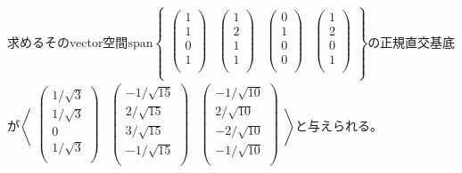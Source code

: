 \documentclass[dvipdfmx]{jsarticle}
\begin{document}
求めるそのvector空間$\mathrm{span}\begin{Bmatrix}
\begin{pmatrix}
  1 \\
  1 \\
  0 \\
  1 \\
\end{pmatrix} & \begin{pmatrix}
  1 \\
  2 \\
  1 \\
  1 \\
\end{pmatrix} & \begin{pmatrix}
  0 \\
  1 \\
  0 \\
  0 \\
\end{pmatrix} & \begin{pmatrix}
  1 \\
  2 \\
  0 \\
  1 \\
\end{pmatrix} \\
\end{Bmatrix}$の正規直交基底が$\left\langle \begin{matrix}
\begin{pmatrix}
  {1}/{\sqrt{3}} \\
  {1}/{\sqrt{3}} \\
  0 \\
  {1}/{\sqrt{3}} \\
\end{pmatrix} & \begin{pmatrix}
   - {1}/{\sqrt{15}} \\
  {2}/{\sqrt{15}} \\
  {3}/{\sqrt{15}} \\
   - {1}/{\sqrt{15}} \\
\end{pmatrix} & \begin{pmatrix}
   - {1}/{\sqrt{10}} \\
  {2}/{\sqrt{10}} \\
   - {2}/{\sqrt{10}} \\
   - {1}/{\sqrt{10}} \\
\end{pmatrix} \\
\end{matrix} \right\rangle$と与えられる。
\end{document}
